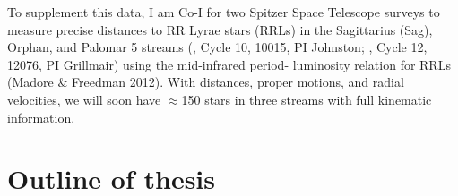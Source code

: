 To supplement this data, I am Co-I for two Spitzer Space Telescope surveys to
measure precise distances to RR Lyrae stars (RRLs) in the Sagittarius (Sag),
Orphan, and Palomar 5 streams (, Cycle 10, 10015, PI Johnston;
, Cycle 12, 12076, PI Grillmair) using the mid-infrared period-
luminosity relation for RRLs (Madore \& Freedman 2012). With distances, proper
motions, and radial velocities, we will soon have $\approx$150 stars in three
streams with full kinematic information.

\section{Outline of thesis}




